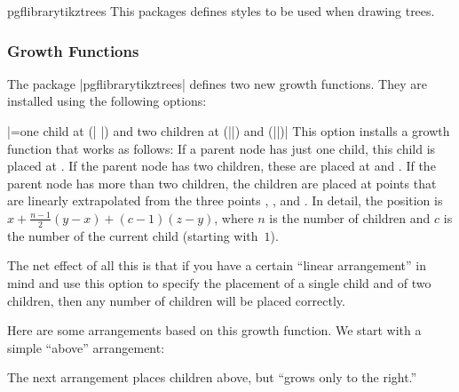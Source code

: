 \begin{package}{pgflibrarytikztrees}
  This packages defines styles to be used when drawing trees. 
\end{package}

\subsubsection{Growth Functions}

The package |pgflibrarytikztrees| defines two new growth
functions. They are installed using the following options:

\begin{itemize}
  |=one child at (|%
  |) and two children at (||) and (||)|
  This option installs a growth function that works as follows: If a
  parent node has just one child, this child is placed at . If
  the parent node has two children, these are placed at  and
  . If the parent node has more than two children, the
  children are placed at points that are linearly extrapolated from
  the three points , , and . In detail, the
  position is $x + \frac{n-1}{2}(y-x) + (c-1)(z-y)$, where $n$ is the
  number of children and $c$ is the number of the current child
  (starting with~$1$).

  The net effect of all this is that if you have a certain ``linear
  arrangement'' in mind and use this option to specify the placement
  of a single child and of two children, then any number of children
  will be placed correctly.

  Here are some arrangements based on this growth function. We start
  with a simple ``above'' arrangement:
\begin{codeexample}[]
\end{codeexample}    

  The next arrangement places children above, but ``grows only to the
  right.'' 
\begin{codeexample}[]
\end{codeexample}    


\end{itemize}
